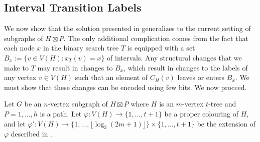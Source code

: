 \documentclass[kpfonts]{patmorin}
\begin{document}
\subsection{Interval Transition Labels}


We now show that the solution presented in  generalizes to the current setting of subgraphs of $H\boxtimes P$.  The only additional complication comes from the fact that each node $x$ in the binary search tree $T$ is equipped with a set $B_x:=\{v\in V(H):x_T(v)=x\}$ of intervals.  Any structural changes that we make to $T$ may result in changes to $B_x$, which result in changes to the labels of any vertex $v\in V(H)$ such that an element of $C_H(v)$ leaves or enters $B_x$.  We must show that these changes can be encoded using few bits.  We now proceed.

Let $G$ be an $n$-vertex subgraph of $H\boxtimes P$ where $H$ is an $m$-vertex $t$-tree and $P=1,\ldots,h$ is a path. Let $\varphi:V(H)\to\{1,\ldots,t+1\}$ be a proper colouring of $H$, and let $\varphi':V(H)\to\{1,\ldots,\lfloor\log_3 (2m+1)\rfloor\}\times\{1,\ldots,t+1\}$ be the extension of $\varphi$ described in .
\end{document}
